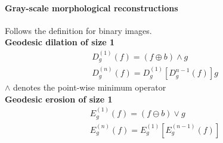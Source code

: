 \paragraph{Gray-scale morphological reconstructions}
Follows the definition for binary images.\\
\textbf{Geodesic dilation of size 1}
\begin{align*}
	D_g^{(1)}(f) = (f\oplus b)\wedge g\\
	D_g^{(n)}(f) = D_g^{(1)}[D_g^{n-1}(f)] g
\end{align*}
$\wedge$ denotes the point-wise minimum operator\\
\textbf{Geodesic erosion of size 1}
\begin{align*}
	E_g^{(1)}(f) = (f\ominus b)\vee g\\
	E_g^{(n)}(f) = E_g^{(1)}[E_g^{(n-1)}(f)]
\end{align*}
